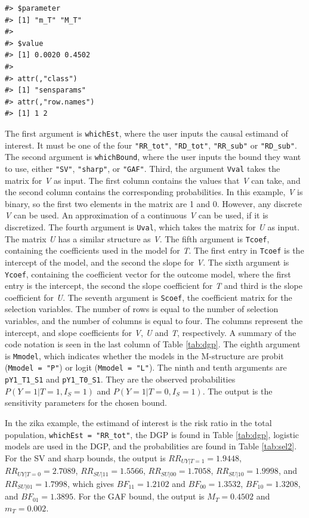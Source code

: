 \begin{verbatim}
#> $parameter
#> [1] "m_T" "M_T"
#> 
#> $value
#> [1] 0.0020 0.4502
#> 
#> attr(,"class")
#> [1] "sensparams"
#> attr(,"row.names")
#> [1] 1 2
\end{verbatim}

The first argument is \texttt{whichEst}, where the user inputs the causal estimand of
interest. It must be one of the four \texttt{"RR\_tot"}, \texttt{"RD\_tot"}, \texttt{"RR\_sub"} or
\texttt{"RD\_sub"}. The second argument is \texttt{whichBound}, where the user inputs the bound
they want to use, either \texttt{"SV"}, \texttt{"sharp"}, or \texttt{"GAF"}. Third, the argument \texttt{Vval}
takes the matrix for \emph{V} as input. The first column contains the values that \emph{V}
can take, and the second column contains the corresponding probabilities. In
this example, \emph{V} is binary, so the first two elements in the matrix are 1 and 0.
However, any discrete \emph{V} can be used. An approximation of a continuous \emph{V} can
be used, if it is discretized. The fourth argument is \texttt{Uval}, which takes the
matrix for \emph{U} as input. The matrix \emph{U} has a similar structure as \emph{V}. The
fifth argument is \texttt{Tcoef}, containing the coefficients used in the model for \emph{T}.
The first entry in \texttt{Tcoef} is the intercept of the model, and the second the
slope for \emph{V}. The sixth argument is \texttt{Ycoef}, containing the coefficient vector
for the outcome model, where the first entry is the intercept, the second the
slope coefficient for \emph{T} and third is the slope coefficient for \emph{U}. The seventh
argument is \texttt{Scoef}, the coefficient matrix for the selection variables. The
number of rows is equal to the number of selection variables, and the number of
columns is equal to four. The columns represent the intercept, and slope
coefficients for \emph{V}, \emph{U} and \emph{T}, respectively. A summary of the code
notation is seen in the last column of Table \ref{tab:dgp}. The eighth argument
is \texttt{Mmodel}, which indicates whether the models in the M-structure are probit
(\texttt{Mmodel\ =\ "P"}) or logit (\texttt{Mmodel\ =\ "L"}). The ninth and tenth arguments are
\texttt{pY1\_T1\_S1} and \texttt{pY1\_T0\_S1}. They are the observed probabilities
\(P(Y=1|T=1,I_S=1)\) and \(P(Y=1|T=0,I_S=1)\). The output is the sensitivity
parameters for the chosen bound.

In the zika example, the estimand of interest is the risk ratio in the
total population, \texttt{whichEst\ =\ "RR\_tot"}, the DGP is found in Table \ref{tab:dgp},
logistic models are used in the DGP, and the probabilities are found in Table
\ref{tab:sel2}. For the SV and sharp bounds, the output is \(RR_{UY|T=1}=1.9448\),
\(RR_{UY|T=0}=2.7089\), \(RR_{SU|11}=1.5566\), \(RR_{SU|00}=1.7058\),
\(RR_{SU|10}=1.9998\), and \(RR_{SU|01}=1.7998\), which gives \(BF_{11}=1.2102\) and
\(BF_{00}=1.3532\), \(BF_{10}=1.3208\), and \(BF_{01}=1.3895\). For the GAF bound,
the output is \(M_T=0.4502\) and \(m_T=0.002\).

